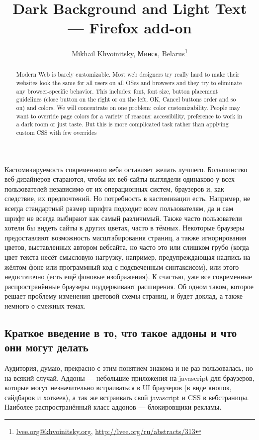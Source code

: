 \documentclass[10pt, a5paper]{article}
\begin{document}
\title{Dark Background and Light Text --- Firefox add-on}
\author{Mikhail Khvoinitsky, Минск, Belarus\footnote{\url{lvee.org@khvoinitsky.org}, \url{http://lvee.org/ru/abstracts/313}}}
\maketitle
\begin{abstract}
Modern Web is barely customizable. Most web designers try really hard to make their websites look the same for all users on all OSes and browsers and they try to eliminate any browser-specific behavior. This includes: font, font size, button placement guidelines (close button on the right or on the left, OK, Cancel buttons order and so on) and colors. We will concentrate on one problem: color customizability. People may want to override page colors for a variety of reasons: accessibility, preference to work in a dark room or just taste. But this is more complicated task rather than applying custom CSS with few overrides
\end{abstract}
Кастомизируемость современного веба оставляет желать лучшего. Большинство веб-дизайнеров стараются, чтобы их веб-сайты выглядели одинаково у всех пользователей независимо от их операционных систем, браузеров и, как следствие, их предпочтений. Но потребность в кастомизации есть. Например, не всегда стандартный размер шрифта подходит всем пользователям, да и сам шрифт не всегда выбирают как самый различимый. Также часто пользователи хотели бы видеть сайты в других цветах, часто в тёмных. Некоторые браузеры предоставляют возможность масштабирования страниц, а также игнорирования цветов, выставленных автором вебсайта, но часто это или слишком грубо (когда цвет текста несёт смысловую нагрузку, например, предупреждающая надпись на жёлтом фоне или программный код с подсвеченным синтаксисом), или этого недостаточно (есть ещё фоновые изображения). К счастью, уже все современные распространённые браузеры поддерживают расширения. Об одном таком, которое решает проблему изменения цветовой схемы страниц, и будет доклад, а также немного о смежных темах.

\subsection*{Краткое введение в то, что такое аддоны и что они могут делать}

Аудитория, думаю, прекрасно с этим понятием знакома и не раз пользовалась, но на всякий случай. Аддоны --- небольшие приложения на javascript для браузеров, которые могут незначительно встраиваться в UI браузеров (в виде кнопок, сайдбаров и хоткеев), а так же встраивать свой javascript и CSS в вебстраницы. Наиболее распространённый класс аддонов --- блокировщики рекламы.
\end{document}
